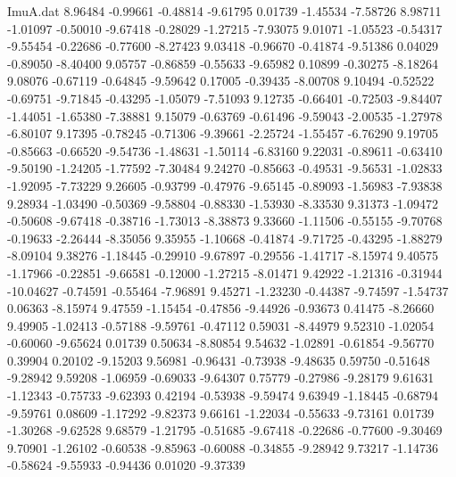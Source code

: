 \begin{filecontents}{ImuA.dat}
   8.96484   -0.99661   -0.48814   -9.61795    0.01739   -1.45534   -7.58726
   8.98711   -1.01097   -0.50010   -9.67418   -0.28029   -1.27215   -7.93075
   9.01071   -1.05523   -0.54317   -9.55454   -0.22686   -0.77600   -8.27423
   9.03418   -0.96670   -0.41874   -9.51386    0.04029   -0.89050   -8.40400
   9.05757   -0.86859   -0.55633   -9.65982    0.10899   -0.30275   -8.18264
   9.08076   -0.67119   -0.64845   -9.59642    0.17005   -0.39435   -8.00708
   9.10494   -0.52522   -0.69751   -9.71845   -0.43295   -1.05079   -7.51093
   9.12735   -0.66401   -0.72503   -9.84407   -1.44051   -1.65380   -7.38881
   9.15079   -0.63769   -0.61496   -9.59043   -2.00535   -1.27978   -6.80107
   9.17395   -0.78245   -0.71306   -9.39661   -2.25724   -1.55457   -6.76290
   9.19705   -0.85663   -0.66520   -9.54736   -1.48631   -1.50114   -6.83160
   9.22031   -0.89611   -0.63410   -9.50190   -1.24205   -1.77592   -7.30484
   9.24270   -0.85663   -0.49531   -9.56531   -1.02833   -1.92095   -7.73229
   9.26605   -0.93799   -0.47976   -9.65145   -0.89093   -1.56983   -7.93838
   9.28934   -1.03490   -0.50369   -9.58804   -0.88330   -1.53930   -8.33530
   9.31373   -1.09472   -0.50608   -9.67418   -0.38716   -1.73013   -8.38873
   9.33660   -1.11506   -0.55155   -9.70768   -0.19633   -2.26444   -8.35056
   9.35955   -1.10668   -0.41874   -9.71725   -0.43295   -1.88279   -8.09104
   9.38276   -1.18445   -0.29910   -9.67897   -0.29556   -1.41717   -8.15974
   9.40575   -1.17966   -0.22851   -9.66581   -0.12000   -1.27215   -8.01471
   9.42922   -1.21316   -0.31944  -10.04627   -0.74591   -0.55464   -7.96891
   9.45271   -1.23230   -0.44387   -9.74597   -1.54737    0.06363   -8.15974
   9.47559   -1.15454   -0.47856   -9.44926   -0.93673    0.41475   -8.26660
   9.49905   -1.02413   -0.57188   -9.59761   -0.47112    0.59031   -8.44979
   9.52310   -1.02054   -0.60060   -9.65624    0.01739    0.50634   -8.80854
   9.54632   -1.02891   -0.61854   -9.56770    0.39904    0.20102   -9.15203
   9.56981   -0.96431   -0.73938   -9.48635    0.59750   -0.51648   -9.28942
   9.59208   -1.06959   -0.69033   -9.64307    0.75779   -0.27986   -9.28179
   9.61631   -1.12343   -0.75733   -9.62393    0.42194   -0.53938   -9.59474
   9.63949   -1.18445   -0.68794   -9.59761    0.08609   -1.17292   -9.82373
   9.66161   -1.22034   -0.55633   -9.73161    0.01739   -1.30268   -9.62528
   9.68579   -1.21795   -0.51685   -9.67418   -0.22686   -0.77600   -9.30469
   9.70901   -1.26102   -0.60538   -9.85963   -0.60088   -0.34855   -9.28942
   9.73217   -1.14736   -0.58624   -9.55933   -0.94436    0.01020   -9.37339

\end{filecontents}
